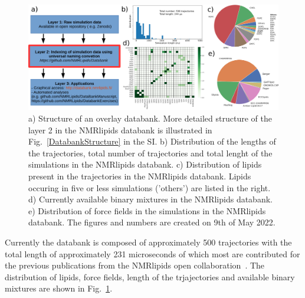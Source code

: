 \documentclass[fleqn,10pt]{wlscirep}
\begin{document}
\begin{figure}
    \centering
    \includegraphics[width = 180mm]{Figures/overlay.pdf}
    \caption{a) Structure of an overlay databank. 
    More detailed structure of the layer 2 in the NMRlipids databank is illustrated in Fig.~\ref{DatabankStructure} in the SI.
    b) Distribution of the lengths of the trajectories, total number of trajectories and total lenght of the simulations in the NMRlipids databank.
    c) Distribution of lipids present in the trajectories in the NMRlipids databank. Lipids occuring in five or less simulations ('others') are listed in the right. 
    d) Currently available binary mixtures in the NMRlipids databank. 
    e) Distribution of force fields in the simulations in the NMRlipids databank.
    The figures and numbers are created on 9th of May 2022.}
    \label{fig:overlay}
\end{figure}

Currently the databank is composed of approximately 500 trajectories with the total length of approximately 231 microseconds of which most are contributed for the previous publications from the NMRlipids open collaboration~\cite{botan15,catte16,antila19,bacle21}. The distribution of lipids, force fields, length of the trjajectories and available binary mixtures are shown in Fig.~\ref{fig:overlay}. 
\end{document}
